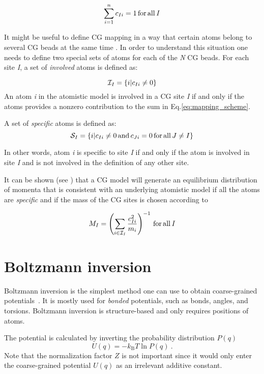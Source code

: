 \begin{equation}
 \sum_{i=1}^{n}c_{Ii}=1\, \rm for\, all\, \it I
\end{equation}

It might be useful to define CG mapping in a way that certain atoms belong to several CG beads at the same time \cite{Fritz:2009}.
In order to understand this situation one needs to define two special sets of atoms for each of the {\it N} CG beads. For each site {\it I}, a set of {\it involved} atoms is defined as:

\begin{equation}
 {\cal I}_I=\{i|c_{Ii}\ne0\}
\end{equation}
An atom {\it i} in the atomistic model is involved in a CG site {\it I} if and only if the atoms provides a nonzero contribution to the sum in Eq.\ref{eq:mapping_scheme}.

A set of {\it specific} atoms is defined as:
\begin{equation}
 {\cal S}_I=\{i|c_{Ii}\ne0\, {\rm and}\, c_{Ji}=0\, {\rm for\,all}\, J\ne I\}
\end{equation}

In other words, atom {\it i} is specific to site {\it I} if and only if the atom is involved in site {\it I} and is not involved in the definition of any other site.

It can be shown (see \cite{Noid:2008.1}) that a CG model will generate an equilibrium distribution of momenta that is consistent with an underlying atomistic model if all the atoms are {\it specific} and if the mass of the CG sites is chosen according to

\begin{equation}
M_I= \left( \sum_{i \in {\cal I}_I}\frac{c_{Ii}^2}{m_i} \right)^{-1}\, \rm for\, all\, {\it I}
\end{equation}

\section{Boltzmann inversion}
\label{sec:bi}

Boltzmann inversion is the simplest method one can use to obtain coarse-grained potentials~\cite{Tschoep:1998}. It is mostly used for {\em bonded} potentials, such as bonds, angles, and torsions. Boltzmann inversion is structure-based and only requires positions of atoms.

The potential is calculated by inverting the probability distribution $P(q)$ 
\begin{equation}
  U(q) = - k_\text{B} T \ln  P(q) ~.
  \label{eq:inv_boltzmann}
\end{equation}
%
Note that the normalization factor $Z$ is not important since it would only enter the coarse-grained potential $U(q)$ as an irrelevant additive constant.

